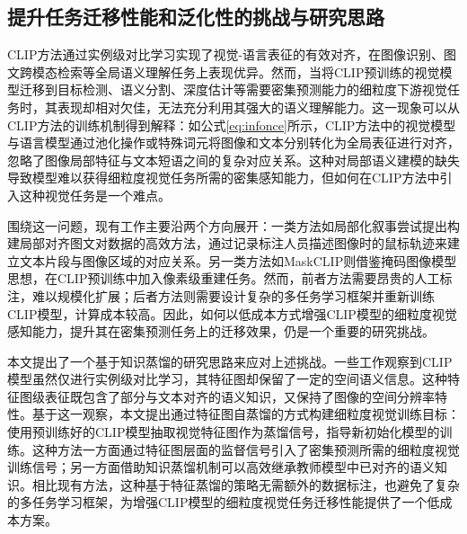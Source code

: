 
\subsection{提升任务迁移性能和泛化性的挑战与研究思路}

CLIP方法通过实例级对比学习实现了视觉-语言表征的有效对齐，在图像识别、图文跨模态检索等全局语义理解任务上表现优异。然而，当将CLIP预训练的视觉模型迁移到目标检测、语义分割、深度估计等需要密集预测能力的细粒度下游视觉任务时，其表现却相对欠佳，无法充分利用其强大的语义理解能力。这一现象可以从CLIP方法的训练机制得到解释：如公式\eqref{eq:infonce}所示，CLIP方法中的视觉模型与语言模型通过池化操作或特殊词元将图像和文本分别转化为全局表征进行对齐，忽略了图像局部特征与文本短语之间的复杂对应关系。这种对局部语义建模的缺失导致模型难以获得细粒度视觉任务所需的密集感知能力，但如何在CLIP方法中引入这种视觉任务是一个难点。

围绕这一问题，现有工作主要沿两个方向展开：一类方法如局部化叙事\cite{LocNar}尝试提出构建局部对齐图文对数据的高效方法，通过记录标注人员描述图像时的鼠标轨迹来建立文本片段与图像区域的对应关系。另一类方法如MaskCLIP\cite{MaskCLIP}则借鉴掩码图像模型\cite{he2022masked}思想，在CLIP预训练中加入像素级重建任务。然而，前者方法需要昂贵的人工标注，难以规模化扩展；后者方法则需要设计复杂的多任务学习框架并重新训练CLIP模型，计算成本较高。因此，如何以低成本方式增强CLIP模型的细粒度视觉感知能力，提升其在密集预测任务上的迁移效果，仍是一个重要的研究挑战。

本文提出了一个基于知识蒸馏\cite{hinton2015knowledge}的研究思路来应对上述挑战。一些工作观察到CLIP模型虽然仅进行实例级对比学习，其特征图却保留了一定的空间语义信息\cite{clipseg}。这种特征图级表征既包含了部分与文本对齐的语义知识，又保持了图像的空间分辨率特性。基于这一观察，本文提出通过特征图自蒸馏的方式构建细粒度视觉训练目标：使用预训练好的CLIP模型抽取视觉特征图作为蒸馏信号，指导新初始化模型的训练。这种方法一方面通过特征图层面的监督信号引入了密集预测所需的细粒度视觉训练信号；另一方面借助知识蒸馏机制可以高效继承教师模型中已对齐的语义知识。相比现有方法，这种基于特征蒸馏的策略无需额外的数据标注，也避免了复杂的多任务学习框架，为增强CLIP模型的细粒度视觉任务迁移性能提供了一个低成本方案。

